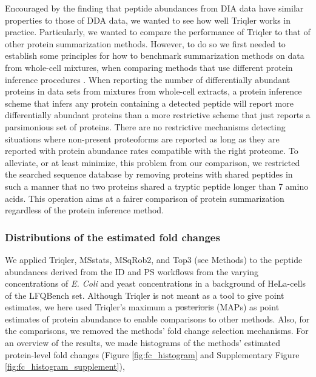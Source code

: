 \documentclass[10pt,letterpaper]{article}
\providecommand{\DIFadd}[1]{{\protect\color{blue}\uwave{#1}}} %
\providecommand{\DIFdel}[1]{{\protect\color{red}\sout{#1}}}                      %
\providecommand{\DIFaddbegin}{} %
\providecommand{\DIFaddend}{} %
\providecommand{\DIFdelbegin}{} %
\providecommand{\DIFdelend}{} %
\newcommand{\DIFscaledelfig}{0.5}
\newlength{\DIFdelgraphicswidth} %
\newlength{\DIFdelgraphicsheight} %
\newcommand{\DIFaddincludegraphics}[2][]{{\color{blue}\fbox{\DIFOincludegraphics[#1]{#2}}}} %
\newcommand{\DIFdelincludegraphics}[2][]{%
\sbox{\DIFdelgraphicsbox}{\DIFOincludegraphics[#1]{#2}}%
\settoboxwidth{\DIFdelgraphicswidth}{\DIFdelgraphicsbox} %
\settoboxtotalheight{\DIFdelgraphicsheight}{\DIFdelgraphicsbox} %
\scalebox{\DIFscaledelfig}{%
\parbox[b]{\DIFdelgraphicswidth}{\usebox{\DIFdelgraphicsbox}\\[-\baselineskip] \rule{\DIFdelgraphicswidth}{0em}}\llap{\resizebox{\DIFdelgraphicswidth}{\DIFdelgraphicsheight}{%
\setlength{\unitlength}{\DIFdelgraphicswidth}%
\begin{picture}(1,1)%
\thicklines\linethickness{2pt} %
{\color[rgb]{1,0,0}\put(0,0){\framebox(1,1){}}}%
{\color[rgb]{1,0,0}\put(0,0){\line( 1,1){1}}}%
{\color[rgb]{1,0,0}\put(0,1){\line(1,-1){1}}}%
\end{picture}%
}\hspace*{3pt}}} %
} %
\DeclareRobustCommand{\DIFaddbegin}{\DIFOaddbegin \let\includegraphics\DIFaddincludegraphics} %
\DeclareRobustCommand{\DIFaddend}{\DIFOaddend \let\includegraphics\DIFOincludegraphics} %
\DeclareRobustCommand{\DIFdelbegin}{\DIFOdelbegin \let\includegraphics\DIFdelincludegraphics} %
\DeclareRobustCommand{\DIFdelend}{\DIFOaddend \let\includegraphics\DIFOincludegraphics} %
\begin{document}
Encouraged by the finding that peptide abundances from DIA data have similar properties to those of DDA data, we wanted to see how well Triqler works in practice. Particularly, we wanted to compare the performance of Triqler to that of other protein summarization methods. However, to do so we first needed to establish some principles for how to benchmark summarization methods on data from whole-cell mixtures, when comparing methods that use different protein inference procedures \cite{serang2012recognizing}. When reporting the number of differentially abundant proteins in data sets from mixtures from whole-cell extracts, a protein inference scheme that infers any protein containing a detected peptide will report more differentially abundant proteins than a more restrictive scheme that just reports a parsimonious set of proteins. There are no restrictive mechanisms detecting situations where non-present proteoforms are reported as long as they are reported with protein abundance rates compatible with the right proteome. To alleviate, or at least minimize, this problem from our comparison, we restricted the searched sequence database by removing proteins with shared peptides in such a manner that no two proteins shared a tryptic peptide longer than 7 amino acids. This operation aims at a fairer comparison of protein summarization regardless of the protein inference method. 

\subsubsection*{Distributions of the estimated fold changes}

We applied Triqler, MSstats, MSqRob2, and Top3 (see Methods) to the peptide abundances derived from the ID and PS workflows from the varying concentrations of {\em E. Coli} and yeast concentrations in a background of HeLa-cells of the LFQBench set. Although Triqler is not meant as a tool to give point estimates, we here used Triqler's maximum a \DIFdelbegin \DIFdel{posterioris }\DIFdelend \DIFaddbegin \DIFadd{posteriori probability }\DIFaddend (MAPs) as point estimates of protein abundance to enable comparisons to other methods. Also, for the comparisons, we removed the methods' fold change selection mechanisms. For an overview of the results, we made histograms of the methods' estimated protein-level fold changes (Figure \ref{fig:fc_histogram} and Supplementary Figure \ref{fig:fc_histogram_supplement}), 
\end{document}
